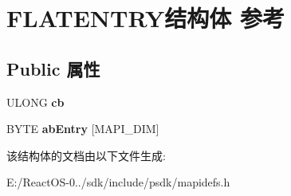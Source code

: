 \hypertarget{struct_f_l_a_t_e_n_t_r_y}{}\section{F\+L\+A\+T\+E\+N\+T\+R\+Y结构体 参考}
\label{struct_f_l_a_t_e_n_t_r_y}
\subsection*{Public 属性}
\begin{DoxyCompactItemize}
\item 
\mbox{\label{struct_f_l_a_t_e_n_t_r_y_a87e75f8fefacd04564870766935b12ce}} 
U\+L\+O\+NG {\bfseries cb}
\item 
\mbox{\label{struct_f_l_a_t_e_n_t_r_y_a1faa0d88ddc5af8264c6051b3dfa7cff}} 
B\+Y\+TE {\bfseries ab\+Entry} \mbox{[}M\+A\+P\+I\+\_\+\+D\+IM\mbox{]}
\end{DoxyCompactItemize}


该结构体的文档由以下文件生成\+:\begin{DoxyCompactItemize}
\item 
E\+:/\+React\+O\+S-\/0../sdk/include/psdk/mapidefs.\+h\end{DoxyCompactItemize}
